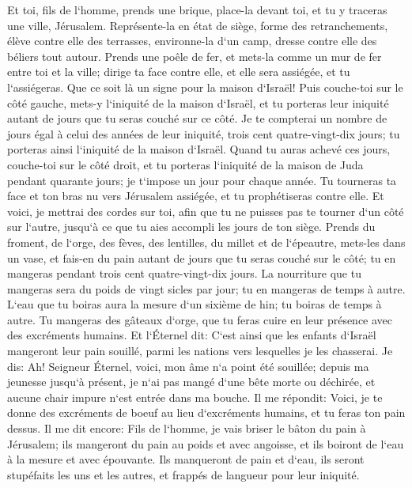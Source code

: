 \verse Et toi, fils de l`homme, prends une brique, place-la devant toi, et tu y traceras une ville, Jérusalem. 
\verse Représente-la en état de siège, forme des retranchements, élève contre elle des terrasses, environne-la d`un camp, dresse contre elle des béliers tout autour. 
\verse Prends une poêle de fer, et mets-la comme un mur de fer entre toi et la ville; dirige ta face contre elle, et elle sera assiégée, et tu l`assiégeras. Que ce soit là un signe pour la maison d`Israël! 
\verse Puis couche-toi sur le côté gauche, mets-y l`iniquité de la maison d`Israël, et tu porteras leur iniquité autant de jours que tu seras couché sur ce côté. 
\verse Je te compterai un nombre de jours égal à celui des années de leur iniquité, trois cent quatre-vingt-dix jours; tu porteras ainsi l`iniquité de la maison d`Israël. 
\verse Quand tu auras achevé ces jours, couche-toi sur le côté droit, et tu porteras l`iniquité de la maison de Juda pendant quarante jours; je t`impose un jour pour chaque année. 
\verse Tu tourneras ta face et ton bras nu vers Jérusalem assiégée, et tu prophétiseras contre elle. 
\verse Et voici, je mettrai des cordes sur toi, afin que tu ne puisses pas te tourner d`un côté sur l`autre, jusqu`à ce que tu aies accompli les jours de ton siège. 
\verse Prends du froment, de l`orge, des fèves, des lentilles, du millet et de l`épeautre, mets-les dans un vase, et fais-en du pain autant de jours que tu seras couché sur le côté; tu en mangeras pendant trois cent quatre-vingt-dix jours. 
\verse La nourriture que tu mangeras sera du poids de vingt sicles par jour; tu en mangeras de temps à autre. 
\verse L`eau que tu boiras aura la mesure d`un sixième de hin; tu boiras de temps à autre. 
\verse Tu mangeras des gâteaux d`orge, que tu feras cuire en leur présence avec des excréments humains. 
\verse Et l`Éternel dit: C`est ainsi que les enfants d`Israël mangeront leur pain souillé, parmi les nations vers lesquelles je les chasserai. 
\verse Je dis: Ah! Seigneur Éternel, voici, mon âme n`a point été souillée; depuis ma jeunesse jusqu`à présent, je n`ai pas mangé d`une bête morte ou déchirée, et aucune chair impure n`est entrée dans ma bouche. 
\verse Il me répondit: Voici, je te donne des excréments de boeuf au lieu d`excréments humains, et tu feras ton pain dessus. 
\verse Il me dit encore: Fils de l`homme, je vais briser le bâton du pain à Jérusalem; ils mangeront du pain au poids et avec angoisse, et ils boiront de l`eau à la mesure et avec épouvante. 
\verse Ils manqueront de pain et d`eau, ils seront stupéfaits les uns et les autres, et frappés de langueur pour leur iniquité. 

